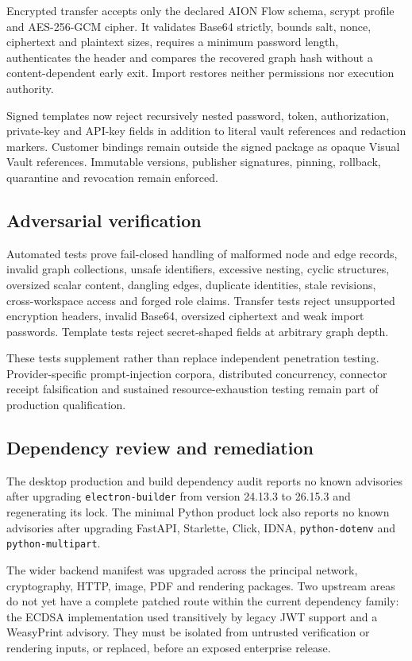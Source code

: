 Encrypted transfer accepts only the declared AION Flow schema, scrypt profile and AES-256-GCM
cipher. It validates Base64 strictly, bounds salt, nonce, ciphertext and plaintext sizes, requires a
minimum password length, authenticates the header and compares the recovered graph hash without a
content-dependent early exit. Import restores neither permissions nor execution authority.

Signed templates now reject recursively nested password, token, authorization, private-key and
API-key fields in addition to literal vault references and redaction markers. Customer bindings
remain outside the signed package as opaque Visual Vault references. Immutable versions,
publisher signatures, pinning, rollback, quarantine and revocation remain enforced.

\subsection{Adversarial verification}

Automated tests prove fail-closed handling of malformed node and edge records, invalid graph
collections, unsafe identifiers, excessive nesting, cyclic structures, oversized scalar content,
dangling edges, duplicate identities, stale revisions, cross-workspace access and forged role
claims. Transfer tests reject unsupported encryption headers, invalid Base64, oversized ciphertext
and weak import passwords. Template tests reject secret-shaped fields at arbitrary graph depth.

These tests supplement rather than replace independent penetration testing. Provider-specific
prompt-injection corpora, distributed concurrency, connector receipt falsification and sustained
resource-exhaustion testing remain part of production qualification.

\subsection{Dependency review and remediation}

The desktop production and build dependency audit reports no known advisories after upgrading
\texttt{electron-builder} from version 24.13.3 to 26.15.3 and regenerating its lock. The minimal
Python product lock also reports no known advisories after upgrading FastAPI, Starlette, Click,
IDNA, \texttt{python-dotenv} and \texttt{python-multipart}.

The wider backend manifest was upgraded across the principal network, cryptography, HTTP, image,
PDF and rendering packages. Two upstream areas do not yet have a complete patched route within the
current dependency family: the ECDSA implementation used transitively by legacy JWT support and a
WeasyPrint advisory. They must be isolated from untrusted verification or rendering inputs, or
replaced, before an exposed enterprise release.

